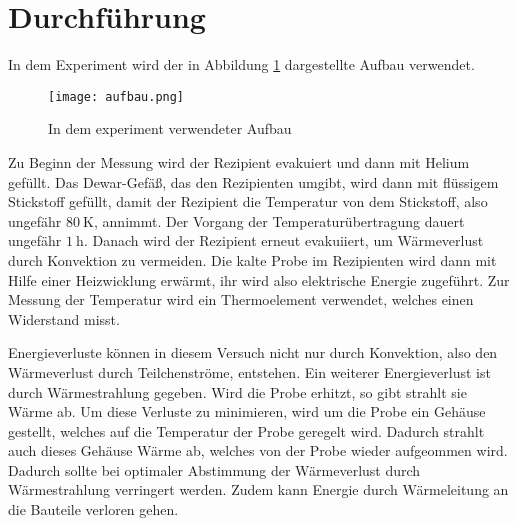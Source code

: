 \section{Durchführung}

In dem Experiment wird der in Abbildung \ref{fig:aufbau} dargestellte Aufbau
verwendet.

\begin{figure}[H]
  \centering
  \texttt{[image: aufbau.png]}
  \caption{In dem experiment verwendeter Aufbau \cite{skript}}
  \label{fig:aufbau}
\end{figure}

Zu Beginn der Messung wird der Rezipient evakuiert und dann mit Helium gefüllt.
Das Dewar-Gefäß, das den Rezipienten umgibt, wird dann mit flüssigem
Stickstoff gefüllt, damit der Rezipient die Temperatur von dem Stickstoff, also
ungefähr $\SI{80}{\kelvin}$, annimmt. Der Vorgang der Temperaturübertragung
dauert ungefähr $\SI{1}{\hour}$. Danach wird der Rezipient erneut evakuiiert,
um Wärmeverlust durch Konvektion zu vermeiden. Die kalte Probe im Rezipienten
wird dann mit Hilfe einer Heizwicklung erwärmt, ihr wird also elektrische
Energie zugeführt. Zur Messung der Temperatur wird ein Thermoelement verwendet,
welches einen Widerstand misst.

Energieverluste können in diesem Versuch nicht nur durch Konvektion, also
den Wärmeverlust durch Teilchenströme, entstehen. Ein weiterer Energieverlust
ist durch Wärmestrahlung gegeben. Wird die Probe erhitzt, so gibt strahlt sie
Wärme ab. Um diese Verluste zu minimieren, wird um die Probe ein Gehäuse
gestellt, welches auf die Temperatur der Probe geregelt wird. Dadurch strahlt
auch dieses Gehäuse Wärme ab, welches von der Probe wieder aufgeommen wird.
Dadurch sollte bei optimaler Abstimmung der Wärmeverlust durch Wärmestrahlung
verringert werden. Zudem kann Energie durch Wärmeleitung an die Bauteile
verloren gehen.
